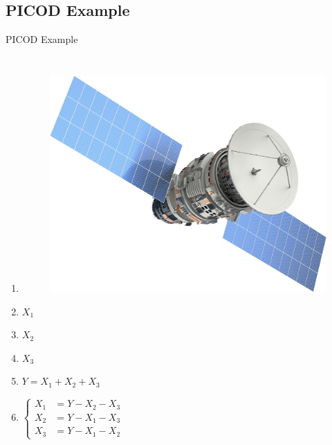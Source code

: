 \documentclass[xcolor=dvipsnames, aspectratio=169]{beamer}
\begin{document}
\subsection{PICOD Example}
\begin{frame}{PICOD Example}
	\begin{columns}[c] %
		
		\begin{enumerate}[]
			
			
			\item<1->[]
			\begin{figure}
				\includegraphics[width=0.4\linewidth]{img/satelite}
			\end{figure}
			
			\item<2-4>[]\centering $X_1$
			\item<3-4>[] \centering$X_2$
			\item<4-4>[] \centering$X_3$
			\item<6->[] $Y = X_1 + X_2 + X_3 $
			\item<7->[] 
			$	\begin{cases}
				X_1 &= Y - X_2 - X_3 \\
				X_2 &= Y - X_1 - X_3  \\
				X_3 &= Y - X_1 - X_2  
			\end{cases}    $
			
		\end{enumerate}
		\centering
		\begin{tikzpicture}[->, >=stealth, auto, semithick]
			

\end{tikzpicture}
\end{columns}
\end{frame}
\end{document}
